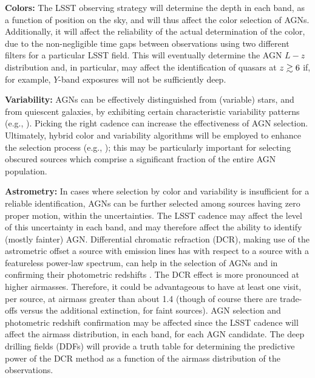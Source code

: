 {\bf Colors:} The LSST observing strategy will determine the depth in each band,
as a function of position on the sky, and will thus affect the color selection
of AGNs. Additionally, it will affect the reliability of the actual
determination of the color, due to the non-negligible time gaps between
observations using two different filters for a particular LSST field. This will
eventually determine the AGN $L-z$ distribution and, in particular, may affect
the identification of quasars at $z\gtrsim 6$ if, for example, $Y$-band exposures
will not be sufficiently deep.

{\bf Variability:} AGNs can be effectively distinguished from (variable)
stars, and from quiescent galaxies, by exhibiting certain characteristic
variability patterns (e.g., \citealt{ButlerandBloom2011}). Picking the
right cadence can increase the effectiveness of AGN selection. Ultimately,
hybrid color and variability algorithms will be employed to enhance
the selection process (e.g., \citealt{Petersetal2015}); this may be
particularly important for selecting obscured sources which comprise a
significant fraction of the entire AGN population.


{\bf Astrometry:} In cases where selection by color and variability is
insufficient for a reliable identification, AGNs can be further selected
among sources having zero proper motion, within the uncertainties. The
LSST cadence may affect the level of this uncertainty in each band, and
may therefore affect the ability to identify (mostly fainter) AGN.
%
Differential chromatic refraction (DCR), making use of the astrometric offset a
source with emission lines has with respect to a source with a featureless
power-law spectrum, can help in the selection of AGNs and in confirming their
photometric redshifts \citep{KaczmarczikEtal2009}. The DCR effect is more
pronounced at higher airmasses. Therefore, it could be advantageous to have at
least one visit, per source, at airmass greater than about 1.4 (though of course
there are trade-offs versus the additional extinction, for faint sources). AGN
selection and photometric redshift confirmation may be affected since the LSST
cadence will affect the airmass distribution, in each band, for each AGN
candidate.
%
The deep drilling fields (DDFs) will provide a truth table for determining
the predictive power of the DCR method as a function of the airmass
distribution of the observations.

